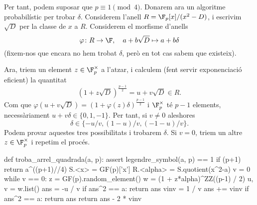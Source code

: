  Per tant, podem suposar que $p\equiv 1\pmod{4}$. Donarem ara un algoritme probabilístic per trobar $\delta$. Considerem l'anell $R=\F_p[x]/(x^2-D)$, i escrivim $\sqrt{D}$ per la classe de $x$ a $R$. Considerem el morfisme d'anells
 \[
 \varphi\colon R\to \F,\quad a+b\sqrt{D}\mapsto a+b\delta
 \]
 (fixem-nos que encara no hem trobat $\delta$, però en tot cas sabem que existeix).
 
 Ara, triem un element $z\in \F_p^\times$ a l'atzar, i calculem (fent servir exponenciació eficient) la quantitat
 \[
 (1+z\sqrt{D})^{\frac{p-1}{2}}=u+v\sqrt{D}\in R.
 \]
 Com que $\varphi(u+v\sqrt{D}) = (1+\varphi(z)\delta)^{\frac{p-1}{2}}$ i $\F_p^\times$ té $p-1$ elements, necessàriament $u+v\delta\in \{0,1,-1\}$. Per tant, si $v\neq 0$ aleshores
 \[
 \delta\in \{-u/v, (1-u)/v, (-1-u)/v\}.
 \]
 Podem provar aquestes tres possibilitats i trobarem $\delta$. Si $v=0$, triem un altre $z\in \F_p^\times$ i repetim el procés.
 
 \begin{python}
 def troba_arrel_quadrada(a, p):
    assert legendre_symbol(a, p) == 1
    if (p+1) %
        return a^((p+1)//4)
    S.<x> = GF(p)['x']
    R.<alpha> = S.quotient(x^2-a)
    v = 0
    while v == 0:
        z = GF(p).random_element()
        w = (1 + z*alpha)^ZZ((p-1) / 2)
        u, v = w.list()
    ans = -u / v
    if ans^2 == a:
        return ans
    vinv = 1 / v
    ans += vinv
    if ans^2 == a:
        return ans
    return ans - 2 * vinv
 \end{python}
